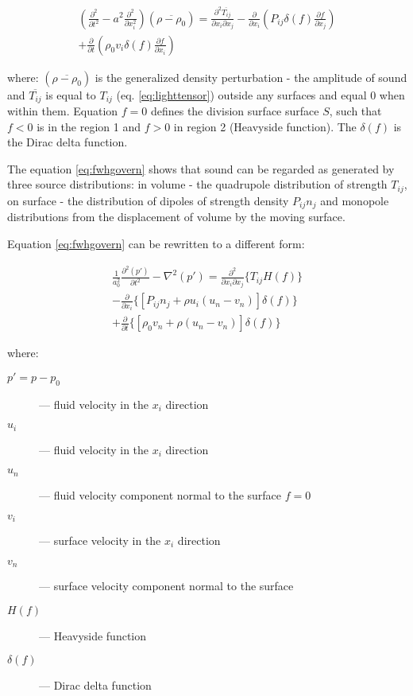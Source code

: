 \begin{equation} \label{eq:fwhgovern}
\begin{split}
\left( \frac{\partial^2}{\partial t^2} - a^2 \frac{\partial^2}{\partial x_i^2} \right)
\left( \overline{\rho - \rho_0} \right)
=
\frac{\partial^2 \overline{T_{ij}}}{\partial x_i \partial x_j}
- \frac{\partial}{\partial x_i} \left( P_{ij} \delta(f) \frac{\partial f}{\partial x_j} \right) \\
+ \frac{\partial}{\partial t} \left( \rho_0 v_i \delta(f) \frac{\partial f}{\partial x_i} \right)
\end{split}
\end{equation}

\noindent where: $\left( \overline{\rho - \rho_0} \right)$ is the generalized density perturbation - the amplitude of sound and $\overline{T_{ij}}$ is equal to $T_{ij}$ (eq. \ref{eq:lighttensor}) outside any surfaces and equal 0 when within them. Equation $f=0$ defines the division surface surface $S$, such that $f<0$ is in the region 1 and $f>0$ in region 2 (Heavyside function). The $\delta(f)$ is the Dirac delta function. 

The equation \ref{eq:fwhgovern} shows that sound can be regarded as generated by three source distributions: in volume - the quadrupole distribution of strength $T_{ij}$, on surface - the distribution of dipoles of strength density $P_{ij}n_j$ and monopole distributions from the displacement of volume by the moving surface.

Equation \ref{eq:fwhgovern} can be rewritten to a different form:

\begin{equation} \label{eq:fwhfluent}
\begin{split}
\frac{1}{a_0^2} \frac{\partial^2 \left(p'\right)}{\partial t^2}- \nabla^2  \left(p'\right)
= \frac{\partial^2}{\partial x_i \partial x_j} \lbrace T_{ij} H \left(f\right) \rbrace \\
- \frac{\partial}{\partial x_i} \lbrace \left[ P_{ij}n_j + \rho u_i \left( u_n - v_n \right) \right] \delta(f) \rbrace \\
+ \frac{\partial}{\partial t} \lbrace \left[ \rho_0 v_n + \rho \left( u_n - v_n \right) \right] \delta(f) \rbrace
\end{split}
\end{equation}

\noindent where:

\begin{description}
\item[$p' = p - p_0$] --- fluid velocity in the $x_i$ direction
\item[$u_i$] --- fluid velocity in the $x_i$ direction
\item[$u_n$] --- fluid velocity component normal to the surface $f = 0$
\item[$v_i$] --- surface velocity in the $x_i$ direction
\item[$v_n$] --- surface velocity component normal to the surface
\item[$H(f)$] --- Heavyside function
\item[$\delta(f)$] --- Dirac delta function
\end{description}

